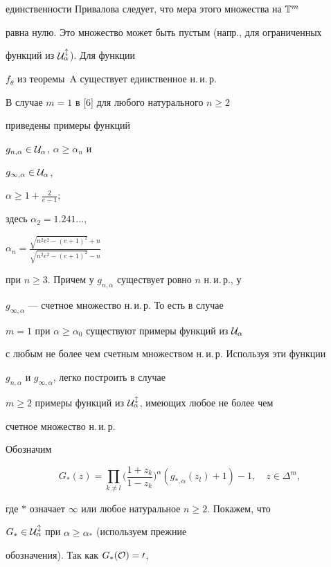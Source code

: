 единственности Привалова следует, что мера этого множества на $\Bbb T^m$


равна нулю. Это множество может быть пустым (напр., для ограниченных


функций из  $\cal U^l_\alpha$). Для функции


$f_\theta$ из теоремы~A существует единственное н.\,и.\,р.





В случае $m=1$ в [6] для любого натурального $n\geq 2$


приведены примеры функций


$g_{n,\alpha}\in\cal U_\alpha$, $\alpha\geq\alpha_n$ и


$g_{\infty ,\alpha}\in\cal U_\alpha$,


$\alpha\geq 1+\displaystyle\frac 2{e-1}$;


здесь $\alpha_2=1.241\dotsc$,


$\alpha_n=\displaystyle{\frac{\sqrt{n^2e^2-(e+1)^2}+n}{\sqrt{n^2e^2-(e+1)^2}-


n}}$


при $n\geq 3$. Причем у $g_{n,\alpha}$ существует ровно $n$ н.\,и.\,р., у


$g_{\infty,\alpha}$ --- счетное множество н.\,и.\,р. То есть в случае


$m=1$ при $\alpha\geq\alpha_0$ существуют примеры функций из $\cal U_\alpha$


с любым не более чем счетным множеством н.\,и.\,р. Используя эти функции


$g_{n,\alpha}$ и $g_{\infty,\alpha}$, легко построить в случае


$m\geq 2$ примеры функций из $\cal U_\alpha^l$, имеющих любое не более чем


счетное множество н.\,и.\,р.





Обозначим


$$


G_\ast (z)=\prod_{k\neq l}\bigg(\frac{1+z_k}{1-z_k}\bigg)^\alpha


(g_{\ast,\alpha}(z_l)+1)-1,\quad z\in\Delta^m,


$$


где $\ast$ означает $\infty$ или любое натуральное $n\ge 2$. Покажем, что


$G_\ast\in\cal U^l_\alpha$ при $\alpha\geq\alpha_\ast$ (используем прежние


обозначения). Так как $G_\ast(\cal O)=0$,



